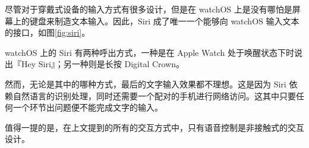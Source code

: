 尽管对于穿戴式设备的输入方式有很多设计，但是在 watchOS 上是没有哪怕是屏幕上的键盘来制造文本输入。因此，Siri 成了唯一一个能够向 watchOS 输入文本的接口，如图\ref{fig:siri}。

watchOS 上的 Siri 有两种呼出方式，一种是在 Apple Watch 处于唤醒状态下时说出『Hey Siri』；另一种则是长按 Digital Crown。

然而，无论是其中的哪种方式，最后的文字输入效果都不理想。这是因为 Siri 依赖自然语言的识别处理，同时还需要一个配对的手机进行网络访问。这其中只要任何一个环节出问题便不能完成文字的输入。

值得一提的是，在上文提到的所有的交互方式中，只有语音控制是非接触式的交互设计。
